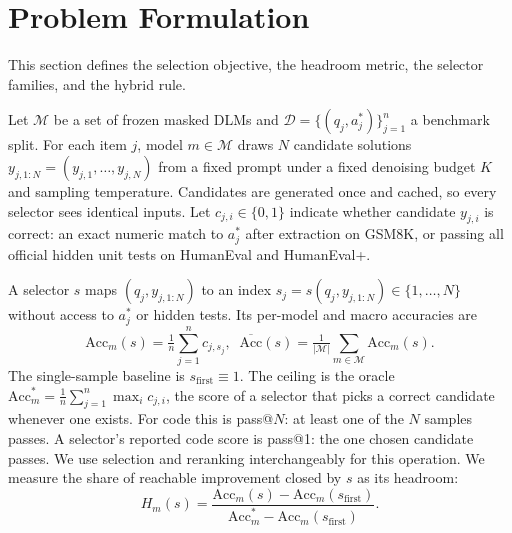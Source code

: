 \section{Problem Formulation}
\label{sec:formulation}

This section defines the selection objective, the headroom metric, the selector families, and the hybrid rule.

Let $\mathcal{M}$ be a set of frozen masked DLMs and $\mathcal{D}=\{(q_j,a_j^\ast)\}_{j=1}^{n}$ a benchmark split. For each item $j$, model $m\in\mathcal{M}$ draws $N$ candidate solutions $y_{j,1:N}=(y_{j,1},\dots,y_{j,N})$ from a fixed prompt under a fixed denoising budget $K$ and sampling temperature. Candidates are generated once and cached, so every selector sees identical inputs. Let $c_{j,i}\in\{0,1\}$ indicate whether candidate $y_{j,i}$ is correct: an exact numeric match to $a_j^\ast$ after extraction on GSM8K, or passing all official hidden unit tests on HumanEval and HumanEval+.

A selector $s$ maps $(q_j,y_{j,1:N})$ to an index $s_j=s(q_j,y_{j,1:N})\in\{1,\dots,N\}$ without access to $a_j^\ast$ or hidden tests. Its per-model and macro accuracies are
{\small
\begin{equation}
\mathrm{Acc}_m(s)=\tfrac{1}{n}\textstyle\sum_{j=1}^{n} c_{j,s_j},\;\;
\overline{\mathrm{Acc}}(s)=\tfrac{1}{|\mathcal{M}|}\textstyle\sum_{m\in\mathcal{M}}\mathrm{Acc}_m(s).
\end{equation}}
The single-sample baseline is $s_{\mathrm{first}}\equiv 1$. The ceiling is the oracle $\mathrm{Acc}_m^\ast=\frac{1}{n}\sum_{j=1}^{n}\max_{i} c_{j,i}$, the score of a selector that picks a correct candidate whenever one exists. For code this is pass@$N$: at least one of the $N$ samples passes. A selector's reported code score is pass@1: the one chosen candidate passes. We use selection and reranking interchangeably for this operation. We measure the share of reachable improvement closed by $s$ as its headroom:
\begin{equation}
H_m(s)=\frac{\mathrm{Acc}_m(s)-\mathrm{Acc}_m(s_{\mathrm{first}})}{\mathrm{Acc}_m^\ast-\mathrm{Acc}_m(s_{\mathrm{first}})}.
\end{equation}

